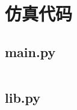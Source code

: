 \documentclass{morningstar}
\begin{document}
\section{仿真代码}
\subsection{main.py}
\inputminted[linenos,fontsize=\zihao{-6},mathescape,numbersep=5pt,frame=lines,firstnumber=8,highlightlines={8,10}]{python}{code/main.py}
\subsection{lib.py}
\inputminted[linenos,fontsize=\zihao{-6},mathescape,numbersep=5pt,frame=lines,firstnumber=8,highlightlines={8,10}]{python}{code/lib.py}
\end{document}
